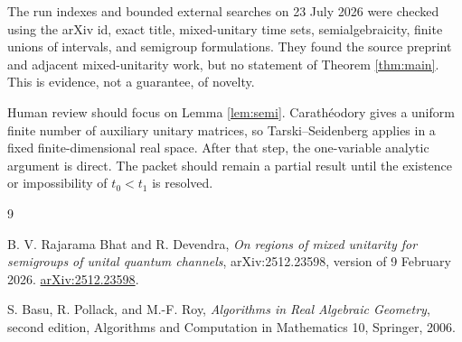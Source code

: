 \documentclass[11pt]{article}
\begin{document}
The run indexes and bounded external searches on 23 July 2026 were checked
using the arXiv id, exact title, mixed-unitary time sets, semialgebraicity,
finite unions of intervals, and semigroup formulations. They found the
source preprint and adjacent mixed-unitarity work, but no statement of
Theorem \ref{thm:main}. This is evidence, not a guarantee, of novelty.

Human review should focus on Lemma \ref{lem:semi}. Carath\'eodory gives a
uniform finite number of auxiliary unitary matrices, so Tarski--Seidenberg
applies in a fixed finite-dimensional real space. After that step, the
one-variable analytic argument is direct. The packet should remain a partial
result until the existence or impossibility of \(t_0<t_1\) is resolved.

\begin{thebibliography}{9}

B. V. Rajarama Bhat and R. Devendra,
\emph{On regions of mixed unitarity for semigroups of unital quantum
channels}, arXiv:2512.23598, version of 9 February 2026.
\href{https://arxiv.org/abs/2512.23598}{arXiv:2512.23598}.

S. Basu, R. Pollack, and M.-F. Roy,
\emph{Algorithms in Real Algebraic Geometry}, second edition,
Algorithms and Computation in Mathematics 10, Springer, 2006.

\end{thebibliography}
\end{document}
